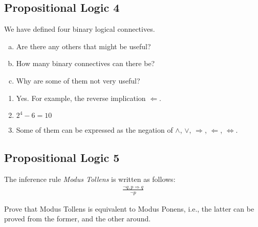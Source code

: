 \documentclass[11pt, answers]{exam}
\begin{document}
%
%
\begin{questions}
\section{Propositional Logic 4}
\question

We have defined four binary logical connectives.

\begin{enumerate}[a.]
	\item Are there any others that might be useful?
	\item How many binary connectives can there be?
	\item Why are some of them not very useful?
\end{enumerate}

\end{questions}

\begin{solution}

\begin{enumerate}[a]
\item
Yes. For example, the reverse implication $\Leftarrow$.
\item
$2^4 - 6 = 10$
\item
Some of them can be expressed as the negation of $\wedge$, $\vee$, $\Rightarrow$, $\Leftarrow$, $\Leftrightarrow$.
\end{enumerate}

\end{solution}

%
%
\begin{questions}
\section{Propositional Logic 5}
\question

The inference rule \textit{Modus Tollens} is written as follows:
\begin{align*}
	\frac{\neg q, p \Rightarrow q}{\neg p}
\end{align*}

Prove that Modus Tollens is equivalent to Modus Ponens, i.e., the latter can be proved from the former, and the other around.

\end{questions}
\end{document}
